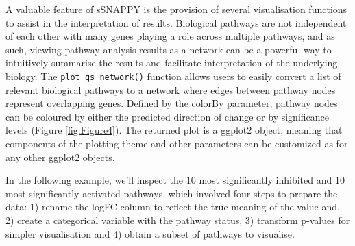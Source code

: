 \documentclass[9pt,a4paper,]{extarticle}
\newenvironment{Shaded}{\begin{snugshade}}{\end{snugshade}}
\newcommand{\AttributeTok}[1]{\textcolor[rgb]{0.13,0.29,0.53}{#1}}
\newcommand{\DecValTok}[1]{\textcolor[rgb]{0.00,0.00,0.81}{#1}}
\newcommand{\FunctionTok}[1]{\textcolor[rgb]{0.13,0.29,0.53}{\textbf{#1}}}
\newcommand{\NormalTok}[1]{#1}
\newcommand{\OtherTok}[1]{\textcolor[rgb]{0.56,0.35,0.01}{#1}}
\newcommand{\SpecialCharTok}[1]{\textcolor[rgb]{0.81,0.36,0.00}{\textbf{#1}}}
\newcommand{\StringTok}[1]{\textcolor[rgb]{0.31,0.60,0.02}{#1}}
\begin{document}
A valuable feature of sSNAPPY is the provision of several visualisation functions to assist in the interpretation of results.
Biological pathways are not independent of each other with many genes playing a role across multiple pathways, and as such, viewing pathway analysis results as a network can be a powerful way to intuitively summarise the results and facilitate interpretation of the underlying biology.
The \texttt{plot\_gs\_network()} function allows users to easily convert a list of relevant biological pathways to a network where edges between pathway nodes represent overlapping genes.
Defined by the colorBy parameter, pathway nodes can be coloured by either the predicted direction of change or by significance levels (Figure \ref{fig:Figure4}).
The returned plot is a ggplot2 \citep{Wickham2009} object, meaning that components of the plotting theme and other parameters can be customized as for any other ggplot2 objects.

In the following example, we'll inspect the 10 most significantly inhibited and 10 most significantly activated pathways, which involved four steps to prepare the data: 1) rename the logFC column to reflect the true meaning of the value and, 2) create a categorical variable with the pathway status, 3) transform p-values for simpler visualisation and 4) obtain a subset of pathways to visualise.

\begin{Shaded}
\end{Shaded}
\end{document}
